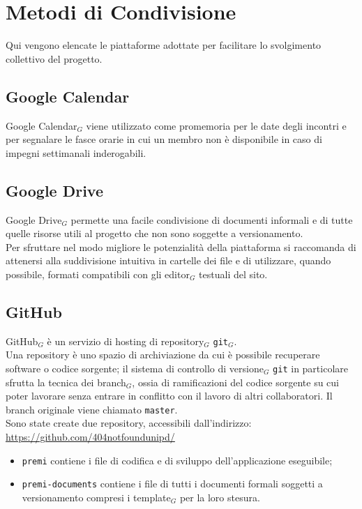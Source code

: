 \section{Metodi di Condivisione}
Qui vengono elencate le piattaforme adottate per facilitare lo svolgimento collettivo del progetto.

\subsection{Google Calendar}
Google Calendar$_{G}$ viene utilizzato come promemoria per le date degli incontri e per segnalare le fasce orarie in cui un membro non è disponibile in caso di impegni settimanali inderogabili.

\subsection{Google Drive}
Google Drive$_{G}$ permette una facile condivisione di documenti informali e di tutte quelle risorse utili al progetto che non sono soggette a versionamento. \\
Per sfruttare nel modo migliore le potenzialità della piattaforma si raccomanda di attenersi alla suddivisione intuitiva in cartelle dei file e di utilizzare, quando possibile, formati compatibili con gli editor$_{G}$ testuali del sito.

\subsection{GitHub}
GitHub$_{G}$ è un servizio di hosting di repository$_{G}$ \texttt{git}$_{G}$. \\
Una repository è uno spazio di archiviazione da cui è possibile recuperare software o codice sorgente; il sistema di controllo di versione$_{G}$ \texttt{git} in particolare sfrutta la tecnica dei branch$_{G}$, ossia di ramificazioni del codice sorgente su cui poter lavorare senza  entrare in conflitto con il lavoro di altri collaboratori. Il branch originale viene chiamato \texttt{master}. \\
Sono state create due repository, accessibili dall'indirizzo:\\ 
\url{https://github.com/404notfoundunipd/}
\begin{itemize}
\item \texttt{premi} contiene i file di codifica e di sviluppo dell'applicazione eseguibile;
\item \texttt{premi-documents} contiene i file di tutti i documenti formali soggetti a versionamento compresi i template$_{G}$ per la loro stesura.
\end{itemize}

